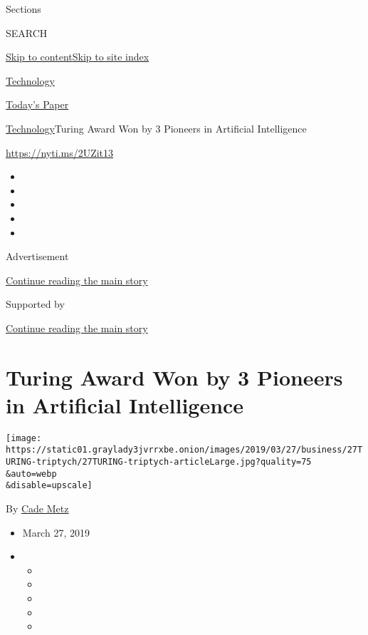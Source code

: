 Sections

SEARCH

\protect\hyperlink{site-content}{Skip to
content}\protect\hyperlink{site-index}{Skip to site index}

\href{https://www.nytimes3xbfgragh.onion/section/technology}{Technology}

\href{https://myaccount.nytimes3xbfgragh.onion/auth/login?response_type=cookie\&client_id=vi}{}

\href{https://www.nytimes3xbfgragh.onion/section/todayspaper}{Today's
Paper}

\href{/section/technology}{Technology}\textbar{}Turing Award Won by 3
Pioneers in Artificial Intelligence

\url{https://nyti.ms/2UZit13}

\begin{itemize}
\item
\item
\item
\item
\item
\end{itemize}

Advertisement

\protect\hyperlink{after-top}{Continue reading the main story}

Supported by

\protect\hyperlink{after-sponsor}{Continue reading the main story}

\hypertarget{turing-award-won-by-3-pioneers-in-artificial-intelligence}{%
\section{Turing Award Won by 3 Pioneers in Artificial
Intelligence}\label{turing-award-won-by-3-pioneers-in-artificial-intelligence}}

\texttt{[image: https://static01.graylady3jvrrxbe.onion/images/2019/03/27/business/27TURING-triptych/27TURING-triptych-articleLarge.jpg?quality=75\\\&auto=webp\\\&disable=upscale]}

By \href{https://www.nytimes3xbfgragh.onion/by/cade-metz}{Cade Metz}

\begin{itemize}
\item
  March 27, 2019
\item
  \begin{itemize}
  \item
  \item
  \item
  \item
  \item
  \end{itemize}
\end{itemize}

